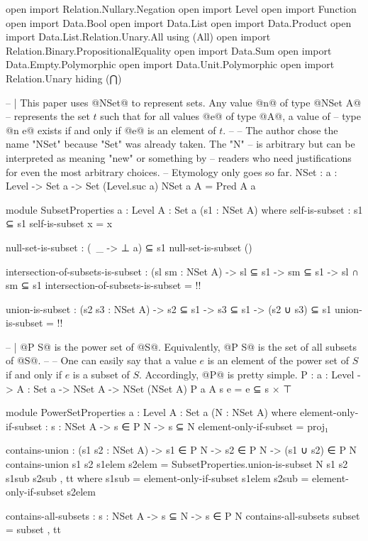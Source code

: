 \begin{code}
open import Relation.Nullary.Negation
open import Level
open import Function
open import Data.Bool
open import Data.List
open import Data.Product
open import Data.List.Relation.Unary.All using (All)
open import Relation.Binary.PropositionalEquality
open import Data.Sum
open import Data.Empty.Polymorphic
open import Data.Unit.Polymorphic
open import Relation.Unary hiding (⋂)

-- | This paper uses @NSet@ to represent sets.  Any value @n@ of type @NSet A@
-- represents the set \(t\) such that for all values @e@ of type @A@, a value of
-- type @n e@ exists if and only if @e@ is an element of \(t\).
--
-- The author chose the name "NSet" because "Set" was already taken.  The "N"
-- is arbitrary but can be interpreted as meaning "new" or something by
-- readers who need justifications for even the most arbitrary choices.
-- Etymology only goes so far.
NSet : {a : Level} -> Set a -> Set (Level.suc a)
NSet {a} A = Pred A a

module SubsetProperties {a : Level} {A : Set a} (s1 : NSet A) where
  self-is-subset : s1 ⊆ s1
  self-is-subset x = x

  null-set-is-subset : (\ _ -> ⊥ {a}) ⊆ s1
  null-set-is-subset ()

  intersection-of-subsets-is-subset :
    (sl sm : NSet A) ->
    sl ⊆ s1 ->
    sm ⊆ s1 ->
    sl ∩ sm ⊆ s1
  intersection-of-subsets-is-subset = {!!}

  union-is-subset :
    (s2 s3 : NSet A) ->
    s2 ⊆ s1 ->
    s3 ⊆ s1 ->
    (s2 ∪ s3) ⊆ s1
  union-is-subset = {!!}

-- | @P S@ is the power set of @S@.  Equivalently, @P S@ is the set of all subsets of @S@.
--
-- One can easily say that a value \(e\) is an element of the power set of \(S\) if and only if \(e\) is a subset of \(S\).  Accordingly, @P@ is pretty simple.
P : {a : Level} -> {A : Set a} -> NSet A -> NSet (NSet A)
P {a} {A} s e = e ⊆ s × ⊤

module PowerSetProperties {a : Level} {A : Set a} (N : NSet A) where
  element-only-if-subset : {s : NSet A} -> s ∈ P N -> s ⊆ N
  element-only-if-subset = proj₁

  contains-union : (s1 s2 : NSet A) -> s1 ∈ P N -> s2 ∈ P N -> (s1 ∪ s2) ∈ P N
  contains-union s1 s2 s1elem s2elem =
    SubsetProperties.union-is-subset N s1 s2 s1sub s2sub , tt
    where
      s1sub = element-only-if-subset s1elem
      s2sub = element-only-if-subset s2elem

  contains-all-subsets : {s : NSet A} -> s ⊆ N -> s ∈ P N
  contains-all-subsets subset = subset , tt


\end{code}
